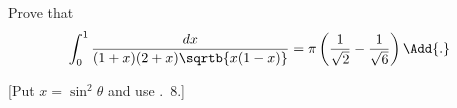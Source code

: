  Prove that
\[
\int_{0}^{1} \frac{dx}{(1 + x)(2 + x) \sqrtb{x(1 - x)}}
  = \pi\left(\frac{1}{\sqrt{2}} - \frac{1}{\sqrt{6}}\right)\Add{.}
\]

[Put $x = \sin^{2}\theta$ and use .~8.]  

